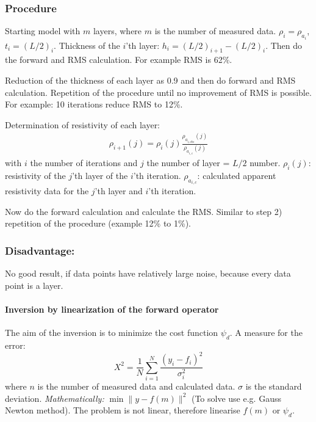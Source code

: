 \subsubsection*{Procedure}
\begin{compactenum}[1)]
\item Starting model with $m$ layers, where $m$ is the number of measured data. $\rho_i=\rho_{a_i}$, $t_i=(L/2)_i$. Thickness of the $i$'th layer: $h_i=(L/2)_{i+1}-(L/2)_{i}$.
Then do the forward and RMS calculation. For example RMS is 62\%.

\item Reduction of the thickness of each layer as 0.9 and then do forward and RMS calculation. Repetition of the procedure until no improvement of RMS is possible.
For example: 10 iterations reduce RMS to 12\%.

\item Determination of resistivity of each layer:
\begin{align*}
\rho_{i+1}(j)=\rho_i(j)\frac{\rho_{a_{i,obs}}(j)}{\rho_{a_{i,c}}(j)}
\end{align*}
with $i$ the number of iterations and $j$ the number of layer = $L/2$ number. $\rho_i(j)$: resistivity of the $j$'th layer of the $i$'th iteration. $\rho_{a_{i,c}}$: calculated apparent resistivity data for the $j$'th layer and $i$'th iteration.

Now do the forward calculation and calculate the RMS. Similar to step 2) repetition of the procedure (example 12\% to 1\%).
\end{compactenum}
\subsubsection*{Disadvantage:}
No good result, if data points have relatively large noise, because every data point is a layer.

\paragraph{Inversion by linearization of the forward operator}
The aim of the inversion is to minimize the cost function $\psi_d$. A measure for the error:
\begin{equation}
X^2=\frac{1}{N}\sum_{i=1}^{N}\frac{(y_i-f_i)^2}{\sigma_i^2}
\end{equation}
where $n$ is the number of measured data and calculated data. $\sigma$ is the standard deviation. 
\textit{Mathematically:} $\min \|y-f(m)\|^2$ (To solve use e.g. Gauss Newton method). The problem is not linear, therefore linearise $f(m)$ or $\psi_d$.

